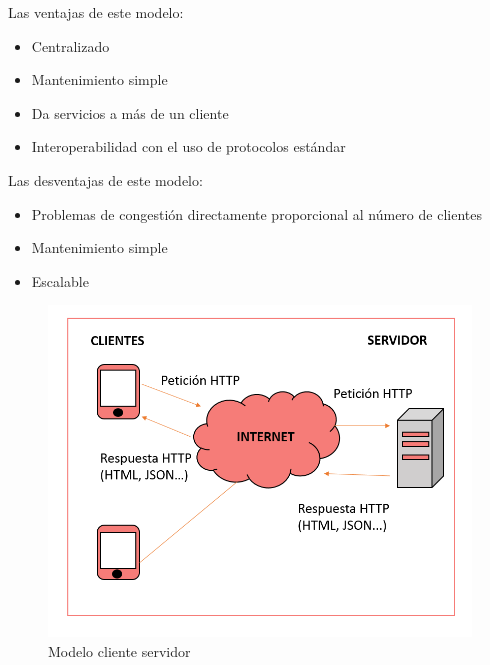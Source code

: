 \documentclass[a4paper, 12pt]{book}
\begin{document}
Las ventajas de este modelo:
\begin{itemize}
    \item Centralizado
    \item Mantenimiento simple
    \item Da servicios a más de un cliente 
    \item Interoperabilidad con el uso de protocolos estándar
\end{itemize}

Las desventajas de este modelo:
\begin{itemize}
    \item Problemas de congestión directamente proporcional al número de clientes
    \item Mantenimiento simple
    \item Escalable~\cite{lizama2016redes} 
\end{itemize}

\begin{figure}[h]
        \centering
        \includegraphics[scale=0.4]{img/Cliente-Servidor.png}
        \caption{Modelo cliente servidor}
        \label{figura:cliente-servidor}
    \end{figure}
\end{document}
